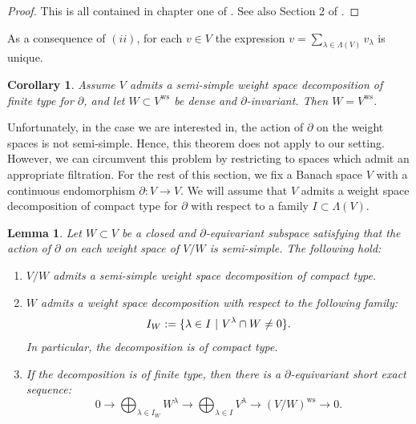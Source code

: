 \documentclass{amsart}
\newtheorem{Lemma}[defi]{Lemma}
\newtheorem{coro}[defi]{Corollary}
\begin{document}
\begin{proof} 
This is all contained in chapter one of \cite{diagonFrechet modules}. See also Section 2 of \cite{Schmidt2010VermaMO}.
\end{proof}
As a consequence of $(ii)$, for each $v\in V$ the expression $v=\sum_{\lambda\in\Lambda(V)}v_{\lambda}$ is unique. 
\begin{coro}\label{coro surjectiveness of ws}
 Assume $V$ admits a semi-simple weight space decomposition of finite type for $\partial$, and let $W\subset V^{\operatorname{ws}}$ be dense and $\partial$-invariant. Then $W=V^{\operatorname{ws}}$.
\end{coro}
Unfortunately, in the case we are interested in, the action of $\partial$ on the weight spaces is not semi-simple. Hence, this theorem does not apply to our setting. However, we can circumvent this problem by restricting to spaces which admit an appropriate filtration. For the rest of this section, we fix a Banach space $V$ with a continuous endomorphism $\partial: V\rightarrow V$. We will assume that $V$ admits a weight space decomposition of compact type for $\partial$ with respect to a family $I\subset \Lambda(V)$.    
\begin{Lemma}\label{Lemma ws decomposition and filtrations}
Let $W\subset V$ be a closed and $\partial$-equivariant subspace satisfying that the action of $\partial$ on each weight space of $V/W$ is semi-simple. The following hold:
\begin{enumerate}[label=(\roman*)]
    \item $V/W$ admits a semi-simple weight space decomposition of compact type.
    \item $W$ admits a 
    weight space decomposition with respect to the following family:
    \begin{equation*}
        I_W:= \{ \lambda \in I \textnormal{ }\vert \textnormal{ } V^{\lambda}\cap W\neq 0  \}.
    \end{equation*}
   In particular, the decomposition is of compact type.
    \item If the decomposition is of finite type, then there is a $\partial$-equivariant short exact sequence:
    \begin{equation*}
        0\rightarrow \bigoplus_{\lambda\in I_W}W^{\lambda}\rightarrow \bigoplus_{\lambda\in I}V^{\lambda}\rightarrow (V/W)^{\operatorname{ws}}\rightarrow 0.
    \end{equation*}
\end{enumerate}
\end{Lemma}
\end{document}
